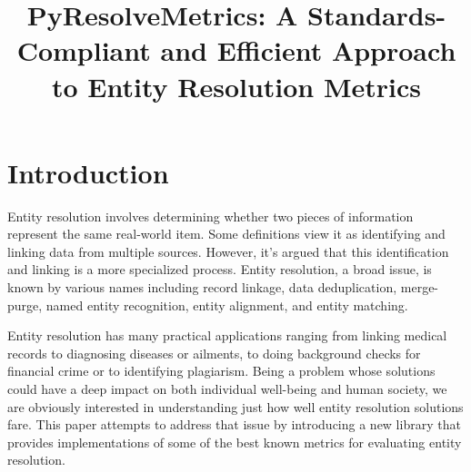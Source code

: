 \documentclass[a4paper,twoside]{article}
\begin{document}
    \title{PyResolveMetrics: A Standards-Compliant and Efficient Approach to Entity Resolution Metrics}
    \author{
    }


    \section{Introduction}\label{sec:introduction}
    Entity resolution involves determining whether two pieces of information
    represent the same real-world item.
    Some definitions view it as identifying and linking data from multiple
    sources\cite{Qia17}.
    However, it's argued that this identification and linking is a more
    specialized process\cite{Tal11}.
    Entity resolution, a broad issue, is known by various names including record
    linkage, data deduplication, merge-purge, named entity recognition, entity
    alignment, and entity matching.

    Entity resolution has many practical applications ranging from linking
    medical records to diagnosing diseases or ailments, to doing background
    checks for financial crime or to identifying plagiarism.
    Being a problem whose solutions could have a deep impact on both individual
    well-being and human society, we are obviously interested in understanding
    just how well entity resolution solutions fare.
    This paper attempts to address that issue by introducing a new library that
    provides implementations of some of the best known metrics for evaluating
    entity resolution\cite{matchescu-er-metrics2023}.
\end{document}
